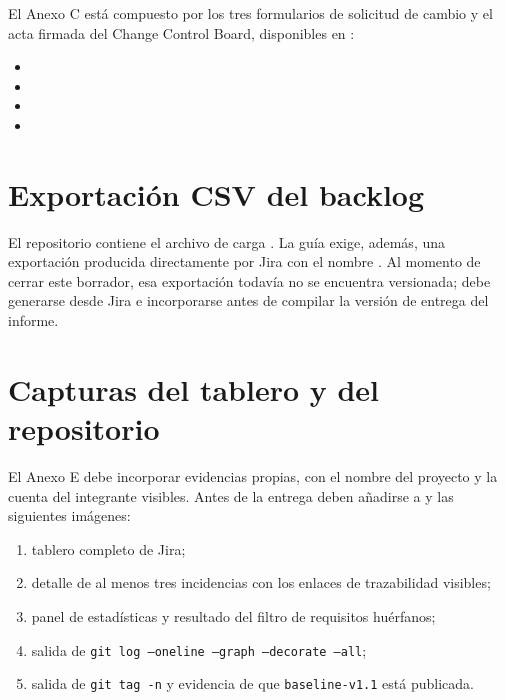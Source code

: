\documentclass[11pt,letterpaper]{article}
\begin{document}
El Anexo C está compuesto por los tres formularios de solicitud de cambio y el acta firmada del
Change Control Board, disponibles en :

\begin{itemize}[leftmargin=*]
  \item {}
  \item {}
  \item {}
  \item {}
\end{itemize}

\section{Exportación CSV del backlog}

El repositorio contiene el archivo de carga . La guía
exige, además, una exportación producida directamente por Jira con el nombre
. Al momento de cerrar este borrador, esa exportación todavía
no se encuentra versionada; debe generarse desde Jira e incorporarse antes de compilar la versión de
entrega del informe.

\section{Capturas del tablero y del repositorio}

El Anexo E debe incorporar evidencias propias, con el nombre del proyecto y la cuenta del integrante
visibles. Antes de la entrega deben añadirse a  y
 las siguientes imágenes:

\begin{enumerate}[leftmargin=*]
  \item tablero completo de Jira;
  \item detalle de al menos tres incidencias con los enlaces de trazabilidad visibles;
  \item panel de estadísticas y resultado del filtro de requisitos huérfanos;
  \item salida de \texttt{git log --oneline --graph --decorate --all};
  \item salida de \texttt{git tag -n} y evidencia de que \texttt{baseline-v1.1} está publicada.
\end{enumerate}
\end{document}
